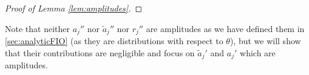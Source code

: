 \documentclass[
	fontsize=11pt, 
	twoside=false, 
	abstract=true, 
	a4paper,
]{scrartcl}
\newcommand{\dd}{\mathrm{d}}
\newcommand{\del}{\partial}
\newcommand{\td}[1]{\tilde{#1}}
\begin{document}
\begin{proof}[Proof of Lemma \ref{lem:amplitudes}]
\end{proof}

Note that neither $a_j''$ nor $\td{a}_j''$ nor $r_j''$ are amplitudes as we have defined them in \cref{sec:analyticFIO} (as they are distributions with respect to $\theta$), but we will show that their contributions are negligible and focus on $\td{a}_j'$ and $a_j'$ which are amplitudes. %
	
\end{document}
